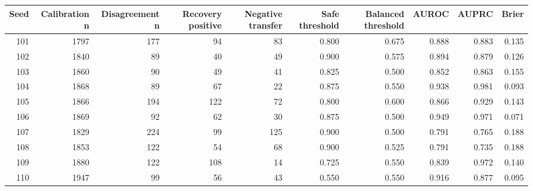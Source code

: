 \begin{tabular}{rrrrrrrrrr}
\toprule
Seed & Calibration n & Disagreement n & Recovery positive & Negative transfer & Safe threshold & Balanced threshold & AUROC & AUPRC & Brier \\
\midrule
101 & 1797 & 177 & 94 & 83 & 0.800 & 0.675 & 0.888 & 0.883 & 0.135 \\
102 & 1840 & 89 & 40 & 49 & 0.900 & 0.575 & 0.894 & 0.879 & 0.126 \\
103 & 1860 & 90 & 49 & 41 & 0.825 & 0.500 & 0.852 & 0.863 & 0.155 \\
104 & 1868 & 89 & 67 & 22 & 0.875 & 0.550 & 0.938 & 0.981 & 0.093 \\
105 & 1866 & 194 & 122 & 72 & 0.800 & 0.600 & 0.866 & 0.929 & 0.143 \\
106 & 1869 & 92 & 62 & 30 & 0.875 & 0.500 & 0.949 & 0.971 & 0.071 \\
107 & 1829 & 224 & 99 & 125 & 0.900 & 0.500 & 0.791 & 0.765 & 0.188 \\
108 & 1853 & 122 & 54 & 68 & 0.900 & 0.525 & 0.791 & 0.735 & 0.188 \\
109 & 1880 & 122 & 108 & 14 & 0.725 & 0.550 & 0.839 & 0.972 & 0.140 \\
110 & 1947 & 99 & 56 & 43 & 0.550 & 0.550 & 0.916 & 0.877 & 0.095 \\
\bottomrule
\end{tabular}

